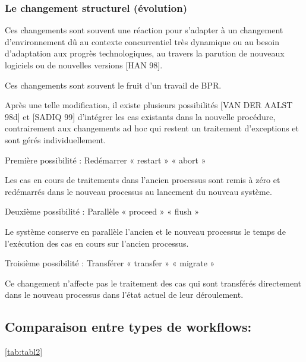 \subsubsection{Le changement structurel (évolution) }
Ces changements sont souvent une réaction pour s’adapter à un changement
d’environnement dû au contexte concurrentiel très dynamique ou au besoin d’adaptation aux
progrès technologiques, au travers la parution de nouveaux logiciels ou de nouvelles versions
[HAN 98].

Ces changements sont souvent le fruit d’un travail de BPR.

Après une telle modification, il existe plusieurs possibilités [VAN DER AALST 98d] et [SADIQ 99] d’intégrer les cas existants dans la nouvelle procédure, contrairement aux changements ad hoc qui restent un traitement d’exceptions et sont gérés individuellement.

Première possibilité : Redémarrer « restart » « abort »

Les cas en cours de traitements dans l’ancien processus sont remis à zéro et redémarrés
dans le nouveau processus au lancement du nouveau système.

Deuxième possibilité : Parallèle « proceed » « flush »

Le système conserve en parallèle l’ancien et le nouveau processus le temps de l’exécution
des cas en cours sur l’ancien processus.

Troisième possibilité : Transférer « transfer » « migrate »

Ce changement n’affecte pas le traitement des cas qui sont transférés directement dans le
nouveau processus dans l’état actuel de leur déroulement. 









 



\subsection{Comparaison entre types de workflows:} \ref{tab:tabl2}
 
